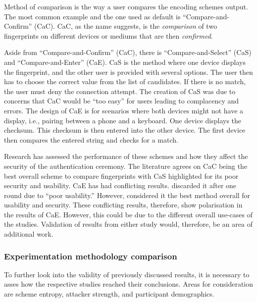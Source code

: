 Method of comparison is the way a user compares the encoding schemes output. The most common example and the one used as default is ``Compare-and-Confirm'' (CaC). CaC, as the name suggests, is the \textit{comparison} of two fingerprints on different devices or mediums that are then \textit{confirmed}. 

Aside from ``Compare-and-Confirm'' (CaC), there is ``Compare-and-Select'' (CaS) and ``Compare-and-Enter'' (CaE). CaS is the method where one device displays the fingerprint, and the other user is provided with several options. The user then has to choose the correct value from the list of candidates. If there is no match, the user must deny the connection attempt. The creation of CaS was due to concerns that CaC would be ``too easy'' for users leading to complacency and errors\cite{uzun2007usability}. The design of CaE is for scenarios where both devices might not have a display, i.e., pairing between a phone and a keyboard. One device displays the checksum. This checksum is then entered into the other device. The first device then compares the entered string and checks for a match.

Research has assessed the performance of these schemes and how they affect the security of the authentication ceremony. The literature agrees on CaC being the best overall scheme to compare fingerprints \cite{tan2017can}\cite{uzun2007usability} with CaS highlighted for its poor security and usability. CaE has had conflicting results. \cite{uzun2007usability} discarded it after one round due to ``poor usability.'' However, \cite{tan2017can} considered it the best method overall for usability and security. These conflicting results, therefore, show polarisation in the results of CaE. However, this could be due to the different overall use-cases of the studies. Validation of results from either study would, therefore, be an area of additional work.

\subsubsection*{Experimentation methodology comparison}
To further look into the validity of previously discussed results, it is necessary to asses how the respective studies reached their conclusions. Areas for consideration are scheme entropy, attacker strength, and participant demographics.

